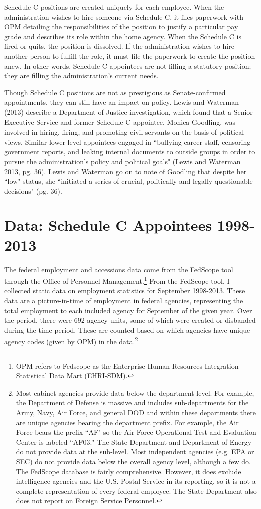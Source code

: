 \documentclass[12pt]{article}
\begin{document}
	Schedule C positions are created uniquely for each employee. When the administration wishes to hire someone via Schedule C, it files paperwork with OPM detailing the responsibilities of the position to justify a particular pay grade and describes its role within the home agency. When the Schedule C is fired or quits, the position is dissolved. If the administration wishes to hire another person to fulfill the role, it must file the paperwork to create the position anew. In other words, Schedule C appointees are not filling a statutory position; they are filling the administration's current needs.	
	
	Though Schedule C positions are not as prestigious as Senate-confirmed appointments, they can still have an impact on policy. Lewis and Waterman (2013) describe a Department of Justice investigation, which found that a Senior Executive Service and former Schedule C appointee, Monica Goodling, was involved in hiring, firing, and promoting civil servants on the basis of political views. Similar lower level appointees engaged in ``bullying career staff, censoring government reports, and leaking internal documents to outside groups in order to pursue the administration's policy and political goals" (Lewis and Waterman 2013, pg. 36). Lewis and Waterman go on to note of Goodling that despite her ``low" status, she ``initiated a series of crucial, politically and legally questionable decisions" (pg. 36). 
	
\section*{Data: Schedule C Appointees 1998-2013}

The federal employment and accessions data come from the FedScope tool through the Office of Personnel Management.\footnote{OPM refers to Fedscope as the Enterprise Human Resources Integration-Statistical Data Mart (EHRI-SDM).} From the FedScope tool, I collected static data on employment statistics for September 1998-2013. These data are a picture-in-time of employment in federal agencies, representing the total employment to each included agency for September of the given year. Over the period, there were 692 agency units, some of which were created or disbanded during the time period. These are counted based on which agencies have unique agency codes (given by OPM) in the data.\footnote{Most cabinet agencies provide data below the department level. For example, the Department of Defense is massive and includes sub-departments for the Army, Navy, Air Force, and general DOD and within these departments there are unique agencies bearing the department prefix. For example, the Air Force bears the prefix ``AF" so the Air Force Operational Test and Evaluation Center is labeled ``AF03." The State Department and Department of Energy do not provide data at the sub-level. Most independent agencies (e.g. EPA or SEC) do not provide data below the overall agency level, although a few do. The FedScope database is fairly comprehensive. However, it does exclude intelligence agencies and the U.S. Postal Service in its reporting, so it is not a complete representation of every federal employee. The State Department also does not report on Foreign Service Personnel.}
\end{document}
